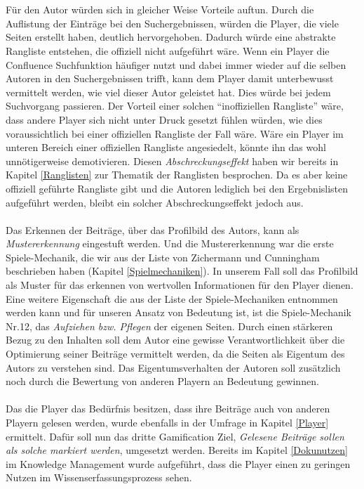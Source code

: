 \documentclass[a4paper,12pt,twoside]{scrartcl}
\begin{document}
\\\\
Für den Autor würden sich in gleicher Weise Vorteile auftun. Durch die Auflistung der Einträge bei den Suchergebnissen, würden die Player, die viele Seiten erstellt haben, deutlich hervorgehoben. Dadurch würde eine abstrakte Rangliste entstehen, die offiziell nicht aufgeführt wäre. Wenn ein Player die Confluence Suchfunktion häufiger nutzt und dabei immer wieder auf die selben Autoren in den Suchergebnissen trifft, kann dem Player damit unterbewusst vermittelt werden, wie viel dieser Autor geleistet hat. Dies würde bei jedem Suchvorgang passieren. Der Vorteil einer solchen \enquote{inoffiziellen Rangliste} wäre, dass andere Player sich nicht unter Druck gesetzt fühlen würden, wie dies voraussichtlich bei einer offiziellen Rangliste der Fall wäre. Wäre ein Player im unteren Bereich einer offiziellen Rangliste angesiedelt, könnte ihn das wohl unnötigerweise demotivieren. Diesen \textit{Abschreckungseffekt} haben wir bereits in Kapitel \ref{Ranglisten} zur Thematik der Ranglisten besprochen. Da es aber keine offiziell geführte Rangliste gibt und die Autoren lediglich bei den Ergebnislisten aufgeführt werden, bleibt ein solcher Abschreckungseffekt jedoch aus. 
\\\\
Das Erkennen der Beiträge, über das Profilbild des Autors, kann als \textit{Mustererkennung} eingestuft werden. Und die Mustererkennung war die erste Spiele-Mechanik, die wir aus der Liste von Zichermann und Cunningham beschrieben haben (Kapitel \ref{Spielmechaniken}). In unserem Fall soll das Profilbild als Muster für das erkennen von wertvollen Informationen für den Player dienen. Eine weitere Eigenschaft die aus der Liste der Spiele-Mechaniken entnommen werden kann und für unseren Ansatz von Bedeutung ist, ist die Spiele-Mechanik Nr.12, das \textit{Aufziehen bzw. Pflegen} der eigenen Seiten. Durch einen stärkeren Bezug zu den Inhalten soll dem Autor eine gewisse Verantwortlichkeit über die Optimierung seiner Beiträge vermittelt werden, da die Seiten als Eigentum des Autors zu verstehen sind. Das Eigentumsverhalten der Autoren soll zusätzlich noch durch die Bewertung von anderen Playern an Bedeutung gewinnen.
\\\\
Das die Player das Bedürfnis besitzen, dass ihre Beiträge auch von anderen Playern gelesen werden, wurde ebenfalls in der Umfrage in Kapitel \ref{Player} ermittelt. Dafür soll nun das dritte Gamification Ziel, \textit{Gelesene Beiträge sollen als solche markiert werden}, umgesetzt werden. Bereits im Kapitel \ref{Dokunutzen} im Knowledge Management wurde aufgeführt, dass die Player einen zu geringen Nutzen im Wissenserfassungsprozess sehen.
\end{document}
